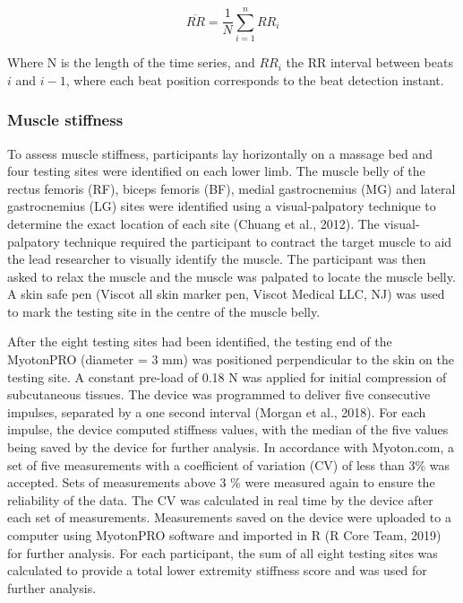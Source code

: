 \documentclass[utf8]{frontiersHLTH}
\begin{document}
\begin{equation} 
  \overline{RR} = \frac{1}{N} \sum_{i=1}^{n} RR_i
\end{equation}

Where N is the length of the time series, and \(RR_i\) the RR interval
between beats \(i\) and \(i-1\), where each beat position corresponds to
the beat detection instant.

\hypertarget{muscle-stiffness}{%
\subsubsection*{Muscle stiffness}\label{muscle-stiffness}}

To assess muscle stiffness, participants lay horizontally on a massage
bed and four testing sites were identified on each lower limb. The
muscle belly of the rectus femoris (RF), biceps femoris (BF), medial
gastrocnemius (MG) and lateral gastrocnemius (LG) sites were identified
using a visual-palpatory technique to determine the exact location of
each site (Chuang et al., 2012). The visual-palpatory technique required
the participant to contract the target muscle to aid the lead researcher
to visually identify the muscle. The participant was then asked to relax
the muscle and the muscle was palpated to locate the muscle belly. A
skin safe pen (Viscot all skin marker pen, Viscot Medical LLC, NJ) was
used to mark the testing site in the centre of the muscle belly.

After the eight testing sites had been identified, the testing end of
the MyotonPRO (diameter = 3 mm) was positioned perpendicular to the skin
on the testing site. A constant pre-load of 0.18 N was applied for
initial compression of subcutaneous tissues. The device was programmed
to deliver five consecutive impulses, separated by a one second interval
(Morgan et al., 2018). For each impulse, the device computed stiffness
values, with the median of the five values being saved by the device for
further analysis. In accordance with Myoton.com, a set of five
measurements with a coefficient of variation (CV) of less than 3\% was
accepted. Sets of measurements above 3 \% were measured again to ensure
the reliability of the data. The CV was calculated in real time by the
device after each set of measurements. Measurements saved on the device
were uploaded to a computer using MyotonPRO software and imported in R
(R Core Team, 2019) for further analysis. For each participant, the sum
of all eight testing sites was calculated to provide a total lower
extremity stiffness score and was used for further analysis.
\end{document}
